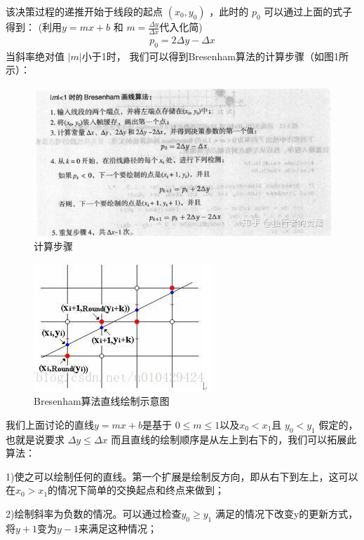 \documentclass[a4paper,UTF8]{article}
\theoremstyle{definition}
\begin{document}
该决策过程的递推开始于线段的起点 $(x_0,y_0)$ ，此时的 $p_0$ 可以通过上面的式子得到：
(利用$y = mx + b$ 和 $m=\frac{\Delta y}{\Delta x}$代入化简)
\begin{align}
p_0=2\Delta y-\Delta x
\end{align}
当斜率绝对值 $|m|$小于1时，
我们可以得到Bresenham算法的计算步骤（如图1所示）：\par
\begin{figure}[ht]

    \centering
    \includegraphics[width = .8\textwidth]{alg.jpg}
    \caption{计算步骤}
    \label{fig:label1}
\end{figure}

\begin{figure}

    \centering
    \includegraphics{20170904103100016.jpg}
    \caption{Bresenham算法直线绘制示意图}
    \label{fig:label2}
\end{figure}
\par   

我们上面讨论的直线$y = mx + b$是基于
$0\leq m\leq 1$以及$x_0<x_1$且 $y_0 < y_1$ 
假定的，
也就是说要求 $\Delta y \leq \Delta x$ 而且直线的绘制顺序是从左上到右下的，我们可以拓展此算法：

1)使之可以绘制任何的直线。第一个扩展是绘制反方向，即从右下到左上，这可以在$x_0 > x_1$的情况下简单的交换起点和终点来做到；

2)绘制斜率为负数的情况。可以通过检查$y_0\geq y_1$ 满足的情况下改变y的更新方式，
将$y+1$变为$y-1$来满足这种情况；
\end{document}
